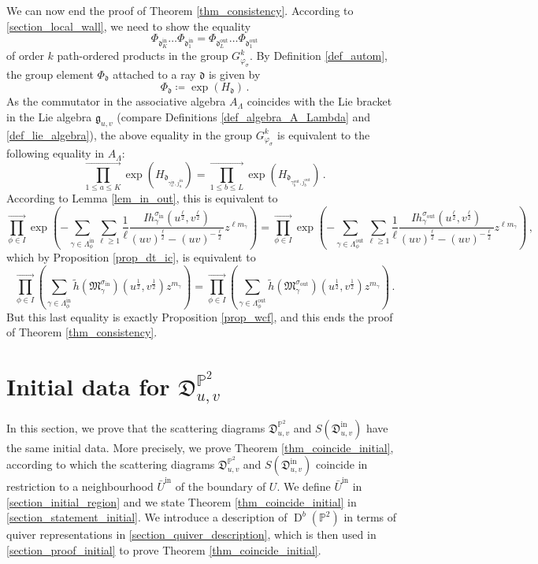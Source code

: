 \documentclass[12pt, a4paper]{amsart}
\newcommand\PP{\mathbb P}
\newcommand\fd{\mathfrak d}
\newcommand\fD{\mathfrak D}
\newcommand\fg{\mathfrak g}
\newcommand\fM{\mathfrak M}
\newcommand\D{\operatorname{D}}
\newcommand\iin{\mathrm{in}}
\newcommand\oout{\mathrm{out}}
\begin{document}
We can now end the proof of Theorem
\ref{thm_consistency}.
According to \cref{section_local_wall}, we need to show the equality 
\[\Phi_{\fd_K^{\iin}}  \dots  \Phi_{\fd_1^{\iin}}
= \Phi_{\fd_L^{\oout}}  \dots \Phi_{\fd_1^{\oout}}\]
of order $k$ path-ordered products in the group 
$G_{\varphi_\sigma}^k$.
By Definition \ref{def_autom}, the group element $\Phi_\fd$ attached to a ray 
$\fd$ is given by 
\[\Phi_{\fd}\coloneqq \exp(H_\fd)   \,.\]
As the commutator in the associative algebra $A_\Lambda$ coincides with the Lie bracket in the Lie algebra $\fg_{u,v}$
(compare Definitions \ref{def_algebra_A_Lambda} and \ref{def_lie_algebra}), the above equality in the group $G_{\varphi_\sigma}^k$ is equivalent to the following equality in $A_\Lambda$:
\[  \prod_{1 \leqslant a \leqslant K}^{\rightarrow}
\exp \left(
H_{\fd_{\gamma_a^\iin, j_a^\iin}} \right)
= 
\prod_{1 \leqslant b \leqslant L}^{\rightarrow}
\exp \left(
H_{\fd_{\gamma_b^\oout,j_b^\oout}} \right)\,.\]
According to Lemma \ref{lem_in_out}, this is equivalent to 
\[ \prod_{\phi \in I}^{\rightarrow}  \exp
\left(-\sum_{\gamma \in \Lambda_\phi^\iin} 
\sum_{\ell \geqslant 1} \frac{1}{\ell}
\frac{Ih_\gamma^{\sigma_{\iin}}(u^{\frac{\ell}{2}}, v^{\frac{\ell}{2}})}{(uv)^{\frac{\ell}{2}}-(uv)^{-\frac{\ell}{2}}} 
z^{\ell m_\gamma} \right)
=
 \prod_{\phi \in I}^{\rightarrow}  \exp
\left(-\sum_{\gamma \in \Lambda_\phi^\oout} 
\sum_{\ell \geqslant 1} \frac{1}{\ell}
\frac{Ih_\gamma^{\sigma_{\oout}}(u^{\frac{\ell}{2}}, v^{\frac{\ell}{2}})}{(uv)^{\frac{\ell}{2}}-(uv)^{-\frac{\ell}{2}}} 
z^{\ell m_\gamma} \right)\,,\]
which by Proposition \ref{prop_dt_ic}, is equivalent to 
\[
\prod_{\phi \in I}^{\rightarrow} 
\left(
\sum_{\gamma \in \Lambda_\phi^\iin}
\tilde{h}(\fM_\gamma^{\sigma_{\iin}})(u^{\frac{1}{2}},
v^{\frac{1}{2}})
z^{m_\gamma}
\right)
= 
\prod_{\phi \in I}^{\rightarrow} 
\left(
\sum_{\gamma \in \Lambda_\phi^{\oout}}
\tilde{h}(\fM_\gamma^{\sigma_{\oout}})(u^{\frac{1}{2}},
v^{\frac{1}{2}})
z^{m_\gamma}
\right)\,.\]
But this last equality is exactly Proposition \ref{prop_wcf}, and this ends the proof of Theorem \ref{thm_consistency}.




\section{Initial data for $\fD^{\PP^2}_{u,v}$}
\label{section_initial_data_proof}

In this section, we prove that the scattering diagrams $\fD^{\PP^2}_{u,v}$ and 
$S(\fD_{u,v}^\iin)$ have the same initial data. 
More precisely, we prove Theorem \ref{thm_coincide_initial}, according to which the scattering diagrams 
$\fD^{\PP^2}_{u,v}$ and 
$S(\fD_{u,v}^\iin)$ coincide in restriction to a neighbourhood 
$\bar{U}^\iin$ of the boundary of $U$.
We define $\bar{U}^\iin$ in  
\cref{section_initial_region} and we state 
Theorem \ref{thm_coincide_initial} 
in \cref{section_statement_initial}.
We introduce a description of 
$\D^b(\PP^2)$ in terms of quiver representations in
\cref{section_quiver_description}, which is then used in \cref{section_proof_initial} to prove 
Theorem \ref{thm_coincide_initial}.
\end{document}
